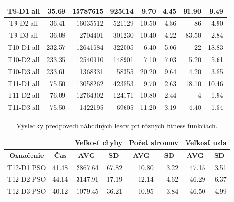 \documentclass[a4paper,slovak,12pt,appendix]{article}
\begin{document}
\begin{appendices}
\begin{table}[!ht]
\begin{tabular}{|c|r|r|r|r|r|r|r|}
		T9-D1 all			&	35.69	&	15787615		&	925014	&	9.70	&	4.45	&	91.90	&	9.49	\\ \hline
		T9-D2 all			&	36.41	&	16035512		&	521129	&	10.50	&	4.86	&	86		&	4.90	\\ \hline
		T9-D3 all			&	36.08	&	2704401			&	301230	&	10.40	&	4.22	&	83.50	&	2.84	\\ \hline

		T10-D1 all		&	232.57	&	12641684	&	322005	&	6.40	&	5.06	&	22		&	18.83	\\ \hline
		T10-D2 all		&	233.35	&	12540910	&	148901	&	7.10	&	7.03	&	5.20	&	5.61	\\ \hline
		T10-D3 all		&	233.61	&	1368331		&	58355		&	20.20	&	9.64	&	4.20	&	3.85	\\ \hline

		T11-D1 all		&	75.50	&	13058262		&	423853	&	9.70	&	2.63	&	18.10	&	10.46	\\ \hline
		T11-D2 all		&	76.09	&	12764302		&	124171	&	10.80	&	2.44	&	4			&	1.94	\\ \hline
		T11-D3 all		&	75.50	&	 1422195 		&	69605		&	11.20	&	3.19	&	4.40	&	1.84	\\ \hline

  \end{tabular}
\end{table}
\newpage

\begin{table}[!ht]
  \centering
  \caption{Výsledky predpovedí náhodných lesov pri rôznych fitness funkciách.}
  \label{tab-test-fitness-result}
  \begin{tabular}{|c|r|r|r|r|r|r|r|}
    \hline
		\multicolumn{2}{|c|}{}									&			\multicolumn{2}{|c|}{\textbf{Veľkosť chyby}}		&					\multicolumn{2}{|c|}{\textbf{Počet stromov}}				&			\multicolumn{2}{|c|}{\textbf{Veľkosť uzla}} \\ \hline
		\multicolumn{1}{|c|}{\textbf{Označenie}}  &		\multicolumn{1}{|c|}{\textbf{Čas}}  	&						\multicolumn{1}{|c|}{\textbf{AVG}}  &   \multicolumn{1}{|c|}{\textbf{SD}}							&								\multicolumn{1}{|c|}{\textbf{AVG}}  &   \multicolumn{1}{|c|}{\textbf{SD}}									&						\multicolumn{1}{|c|}{\textbf{AVG}}  &   \multicolumn{1}{|c|}{\textbf{SD}} 	 			\\ \hline
		T12-D1 PSO			&	41.48	&	2867.64	&	67.82	&	10.80	&	3.22	&	47.15	&	3.51	\\ \hline
		T12-D2 PSO			&	44.14	&	3147.91	&	17.19	&	12.14	&	4.62	&	46.29	&	6.37	\\ \hline
		T12-D3 PSO			&	40.12	&	1079.45	&	36.21	&	10.95	&	3.84	&	46.50	&	4.99	\\ \hline


\end{tabular}
\end{table}
\end{appendices}
\end{document}
